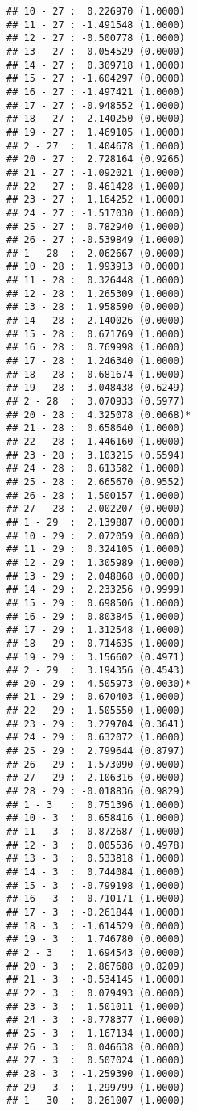 \documentclass[12pt,]{article}
\begin{document}
\begin{verbatim}
## 10 - 27 :  0.226970 (1.0000)
## 11 - 27 : -1.491548 (1.0000)
## 12 - 27 : -0.500778 (1.0000)
## 13 - 27 :  0.054529 (0.0000)
## 14 - 27 :  0.309718 (1.0000)
## 15 - 27 : -1.604297 (0.0000)
## 16 - 27 : -1.497421 (1.0000)
## 17 - 27 : -0.948552 (1.0000)
## 18 - 27 : -2.140250 (0.0000)
## 19 - 27 :  1.469105 (1.0000)
## 2 - 27  :  1.404678 (1.0000)
## 20 - 27 :  2.728164 (0.9266)
## 21 - 27 : -1.092021 (1.0000)
## 22 - 27 : -0.461428 (1.0000)
## 23 - 27 :  1.164252 (1.0000)
## 24 - 27 : -1.517030 (1.0000)
## 25 - 27 :  0.782940 (1.0000)
## 26 - 27 : -0.539849 (1.0000)
## 1 - 28  :  2.062667 (0.0000)
## 10 - 28 :  1.993913 (0.0000)
## 11 - 28 :  0.326448 (1.0000)
## 12 - 28 :  1.265309 (1.0000)
## 13 - 28 :  1.958590 (0.0000)
## 14 - 28 :  2.140026 (0.0000)
## 15 - 28 :  0.671769 (1.0000)
## 16 - 28 :  0.769998 (1.0000)
## 17 - 28 :  1.246340 (1.0000)
## 18 - 28 : -0.681674 (1.0000)
## 19 - 28 :  3.048438 (0.6249)
## 2 - 28  :  3.070933 (0.5977)
## 20 - 28 :  4.325078 (0.0068)*
## 21 - 28 :  0.658640 (1.0000)
## 22 - 28 :  1.446160 (1.0000)
## 23 - 28 :  3.103215 (0.5594)
## 24 - 28 :  0.613582 (1.0000)
## 25 - 28 :  2.665670 (0.9552)
## 26 - 28 :  1.500157 (1.0000)
## 27 - 28 :  2.002207 (0.0000)
## 1 - 29  :  2.139887 (0.0000)
## 10 - 29 :  2.072059 (0.0000)
## 11 - 29 :  0.324105 (1.0000)
## 12 - 29 :  1.305989 (1.0000)
## 13 - 29 :  2.048868 (0.0000)
## 14 - 29 :  2.233256 (0.9999)
## 15 - 29 :  0.698506 (1.0000)
## 16 - 29 :  0.803845 (1.0000)
## 17 - 29 :  1.312548 (1.0000)
## 18 - 29 : -0.714635 (1.0000)
## 19 - 29 :  3.156602 (0.4971)
## 2 - 29  :  3.194356 (0.4543)
## 20 - 29 :  4.505973 (0.0030)*
## 21 - 29 :  0.670403 (1.0000)
## 22 - 29 :  1.505550 (1.0000)
## 23 - 29 :  3.279704 (0.3641)
## 24 - 29 :  0.632072 (1.0000)
## 25 - 29 :  2.799644 (0.8797)
## 26 - 29 :  1.573090 (0.0000)
## 27 - 29 :  2.106316 (0.0000)
## 28 - 29 : -0.018836 (0.9829)
## 1 - 3   :  0.751396 (1.0000)
## 10 - 3  :  0.658416 (1.0000)
## 11 - 3  : -0.872687 (1.0000)
## 12 - 3  :  0.005536 (0.4978)
## 13 - 3  :  0.533818 (1.0000)
## 14 - 3  :  0.744084 (1.0000)
## 15 - 3  : -0.799198 (1.0000)
## 16 - 3  : -0.710171 (1.0000)
## 17 - 3  : -0.261844 (1.0000)
## 18 - 3  : -1.614529 (0.0000)
## 19 - 3  :  1.746780 (0.0000)
## 2 - 3   :  1.694543 (0.0000)
## 20 - 3  :  2.867688 (0.8209)
## 21 - 3  : -0.534145 (1.0000)
## 22 - 3  :  0.079493 (0.0000)
## 23 - 3  :  1.501011 (1.0000)
## 24 - 3  : -0.778377 (1.0000)
## 25 - 3  :  1.167134 (1.0000)
## 26 - 3  :  0.046638 (0.0000)
## 27 - 3  :  0.507024 (1.0000)
## 28 - 3  : -1.259390 (1.0000)
## 29 - 3  : -1.299799 (1.0000)
## 1 - 30  :  0.261007 (1.0000)

\end{verbatim}
\end{document}
